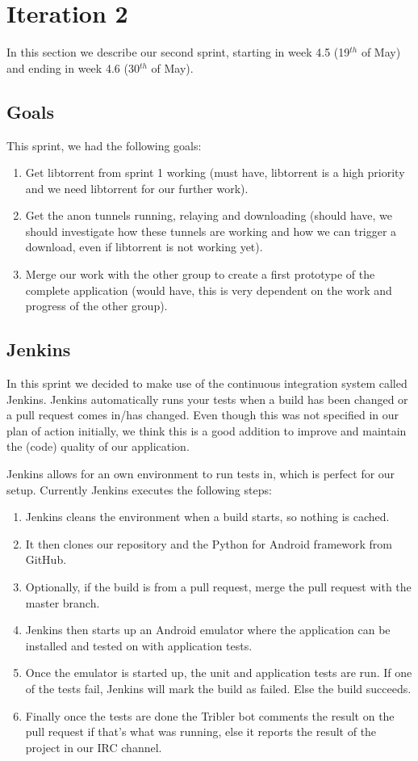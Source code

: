 \section{Iteration 2}
\label{iteration2}
	In this section we describe our second sprint, starting in week 4.5 (19$^{th}$ of May) and ending in week 4.6 (30$^{th}$ of May).

	\subsection{Goals}
		This sprint, we had the following goals:
	
		\begin{enumerate}
			\item Get libtorrent from sprint 1 working (must have, libtorrent is a high priority and we need libtorrent for our further work).
			\item Get the anon tunnels running, relaying and downloading (should have, we should investigate how these tunnels are working and how we can trigger a download, even if libtorrent is not working yet).
			\item Merge our work with the other group to create a first prototype of the complete application (would have, this is very dependent on the work and progress of the other group).
		\end{enumerate}
	
	\subsection{Jenkins}
		In this sprint we decided to make use of the continuous integration system called Jenkins. Jenkins automatically runs your tests when a build has been changed or a pull request comes in/has changed. 
		Even though this was not specified in our plan of action initially, we think this is a good addition to improve and maintain the (code) quality of our application.
		
		Jenkins allows for an own environment to run tests in, which is perfect for our setup. Currently Jenkins executes the following steps:
		
		\begin{enumerate}
			\item Jenkins cleans the environment when a build starts, so nothing is cached.
			\item It then clones our repository and the Python for Android framework from GitHub.
			\item Optionally, if the build is from a pull request, merge the pull request with the master branch.
			\item Jenkins then starts up an Android emulator where the application can be installed and tested on with application tests.
			\item Once the emulator is started up, the unit and application tests are run. If one of the tests fail, Jenkins will mark the build as failed. Else the build succeeds.
			\item Finally once the tests are done the Tribler bot comments the result on the pull request if that's what was running, else it reports the result of the project in our IRC channel.
		\end{enumerate} 
		

